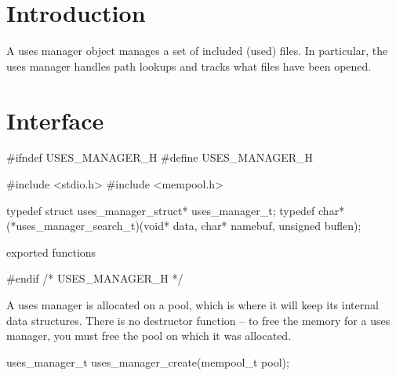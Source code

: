 \section{Introduction}%

A uses manager object manages a set of included (used) files.
In particular, the uses manager handles path lookups and
tracks what files have been opened.


\section{Interface}

\endmoddef\nwstartdeflinemarkup\nwenddeflinemarkup
#ifndef USES_MANAGER_H
#define USES_MANAGER_H

#include <stdio.h>
#include <mempool.h>

typedef struct uses_manager_struct* uses_manager_t;
typedef char* (*uses_manager_search_t)(void* data, char* namebuf, 
                                               unsigned buflen);

\LA{}exported functions~{\nwtagstyle{}}\RA{}

#endif /* USES_MANAGER_H */
\nwendcode{}\nwdocspar

A uses manager is allocated on a pool, which is where it will
keep its internal data structures.  There is no destructor
function -- to free the memory for a uses manager, you must
free the pool on which it was allocated.

\nwenddocs{}\endmoddef\nwstartdeflinemarkup{}\nwenddeflinemarkup
uses_manager_t uses_manager_create(mempool_t pool);

\nwendcode{}\nwdocspar

